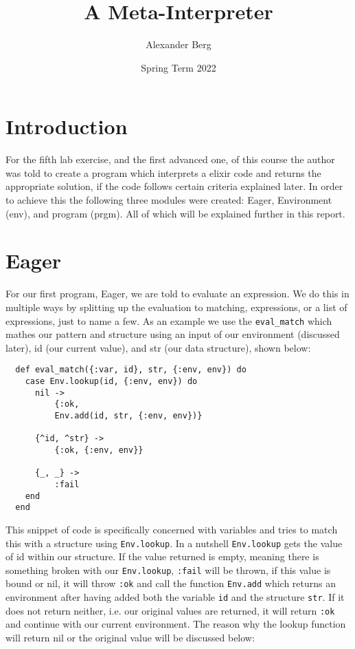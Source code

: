 \documentclass[a4paper,11pt]{article}
\begin{document}
\title{
    \textbf{A Meta-Interpreter}
}
\author{Alexander Berg}
\date{Spring Term 2022}

\maketitle

\section*{Introduction}

For the fifth lab exercise, and the first advanced one, of this course the author was told to create a program which interprets a elixir code and returns the appropriate solution, if the code follows certain criteria explained later.
In order to achieve this the following three modules were created: Eager, Environment (env), and program (prgm). All of which will be explained further in this report.

\section*{Eager}

For our first program, Eager, we are told to evaluate an expression. We do this in multiple ways by splitting up the evaluation to matching, expressions, or a list of expressions, just to name a few. As an example we use the {\tt eval\_match} which mathes our pattern and structure using an input of our environment (discussed later), id (our current value), and str (our data structure), shown below:

\begin{verbatim}
  def eval_match({:var, id}, str, {:env, env}) do
    case Env.lookup(id, {:env, env}) do
      nil ->
	      {:ok,
	      Env.add(id, str, {:env, env})}
	
      {^id, ^str} ->
	      {:ok, {:env, env}}
	
      {_, _} ->
	      :fail
    end
  end
\end{verbatim}

This snippet of code is specifically concerned with variables and tries to match this with a structure using {\tt Env.lookup}. In a nutshell {\tt Env.lookup} gets the value of id within our structure. If the value returned is empty, meaning there is something broken with our {\tt Env.lookup}, {\tt :fail} will be thrown, if this value is bound or nil, it will throw {\tt :ok} and call the function {\tt Env.add} which returns an environment after having added both the variable {\tt id} and the structure {\tt str}. If it does not return neither, i.e. our original values are returned, it will return {\tt :ok} and continue with our current environment. The reason why the lookup function will return nil or the original value will be discussed below:
\end{document}
